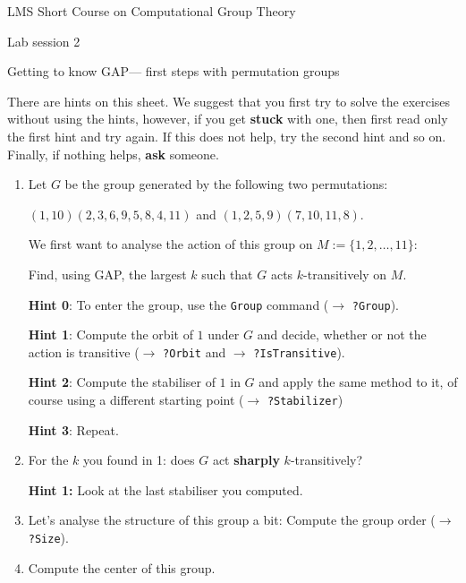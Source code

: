 \documentclass[12pt]{article}
\newcommand{\GAP}{\textsf{GAP}}
\begin{document}
\begin{center}
\large LMS Short Course on Computational Group Theory

\Large Lab session 2

\large Getting to know \GAP --- first steps with permutation groups
\end{center}

{\small
There are hints on
this sheet. We suggest that you first try to solve the exercises without
using the hints, however, if you get \textbf{stuck} with one, then first
read only the first hint and try again. If this does not help, try the
second hint and so on. Finally, if nothing helps, \textbf{ask} someone.}

\begin{enumerate}
\setlength{\parskip}{0pt}
\item Let $G$ be the group generated by the following two permutations:

\begin{center}{\small
$(1,10)(2,3,6,9,5,8,4,11)$ and $(1,2,5,9)(7,10,11,8)$.}
\end{center}

We first want to analyse the action of this group on $M := \{1,2,\ldots,11\}$:

Find, using \GAP, the largest $k$ such that $G$ acts $k$-transitively
on $M$.

\smallskip
\textbf{Hint 0}: To enter the group, use the \texttt{Group} command ($\to$
\texttt{?Group}).

\smallskip
\textbf{Hint 1}: Compute the orbit of $1$ under $G$ and decide, whether or
not the action is transitive ($\to$ \texttt{?Orbit} and
$\to$ \texttt{?IsTransitive}).

\smallskip
\textbf{Hint 2}: Compute the stabiliser of $1$ in $G$ and apply the same
method to it, of course using a different starting point
($\to$ \texttt{?Stabilizer})

\smallskip
\textbf{Hint 3}: Repeat.
\item For the $k$ you found in 1: does $G$ act \textbf{sharply}
$k$-transitively?

\smallskip
\textbf{Hint 1:} Look at the last stabiliser you computed.
\item Let's analyse the structure of this group a bit:
Compute the group order ($\to$ \texttt{?Size}).
\item Compute the center of this group.


\end{enumerate}
\end{document}
